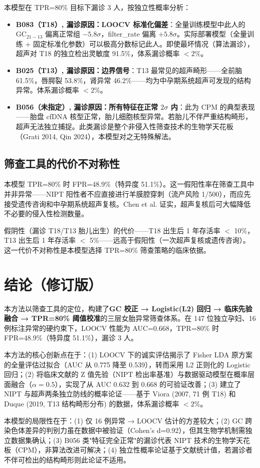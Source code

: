 \documentclass{internal-report}
\begin{document}
本模型在 TPR=80\% 目标下漏诊 3 人，按独立性概率分析：

\begin{itemize}
    \item \textbf{B083（T18）, 漏诊原因：LOOCV 标准化偏差}：全量训练模型中此人的 GC$_{21-13}$ 偏离正常组 $-5.8\sigma$，filter\_rate 偏离 $+5.8\sigma$。实际部署模型（全量训练 + 固定标准化参数）可以极高分数标记此人。即使最坏情况（算法漏诊），超声对 T18 的独立检出灵敏度 91.5\%\cite{viora2007}，体系漏诊概率 $< 2\%$。
    
    \item \textbf{B025（T13）, 漏诊原因：边界信号}：T13 最常见的超声畸形——全前脑 61.5\%，唇腭裂 53.8\%，肾异常 46.2\%\cite{duque2019}——均为中孕期系统超声可发现的结构异常。体系漏诊概率 $< 2\%$。
    
    \item \textbf{B056（未指定）, 漏诊原因：所有特征在正常 $2\sigma$ 内}：此为 CPM 的典型表现——胎盘 cfDNA 核型正常，胎儿细胞核型异常。若胎儿不伴严重结构畸形，超声无法独立捕捉。此类漏诊是整个非侵入性筛查技术的生物学天花板（Grati 2014, Qin 2024），本模型对之无特殊解法。
\end{itemize}

\subsection{筛查工具的代价不对称性}

本模型 TPR=80\% 时 FPR=48.9\%（特异度 51.1\%）。这一假阳性率在筛查工具中并非异常——NIPT 阳性者不应直接进行羊膜腔穿刺（流产风险 1/500），而应先接受遗传咨询和中孕期系统超声复核。Chen et al.\cite{chen2025} 证实，超声复核后可大幅降低不必要的侵入性检测数量。

假阴性（漏诊 T18/T13 胎儿出生）的代价——T18 出生后 1 年存活率 $<$ 10\%，T13 出生后 1 年存活率 $<$ 5\%——远高于假阳性（一次超声复核或遗传咨询）。这一代价不对称性是本模型选择 TPR=80\% 筛查策略的临床依据。

\section{结论（修订版）}

本方法以筛查工具的定位，构建了\textbf{GC 校正 → Logistic(L2) 回归 → 临床先验融合 → TPR=80\% 阈值校准}的三层女胎异常筛查体系。在 147 位独立孕妇、16 例标注异常的硬约束下，LOOCV 性能为 AUC=0.668，TPR=80\% 时 FPR=48.9\%（特异度 51.1\%），漏诊 3 人。

本方法的核心创新点在于：(1) LOOCV 下的诚实评估揭示了 Fisher LDA 原方案的全量评估过拟合（AUC 从 0.775 降至 0.539），转而采用 L2 正则化的 Logistic 回归；(2) 将临床文献的 Z 值先验（NIPT 检出率基准）与数据驱动模型在概率层面融合（$\alpha=0.5$），实现了从 AUC 0.632 到 0.668 的可验证改善；(3) 建立了 NIPT 与超声两条独立防线的概率论证——基于 Viora (2007, 71 例 T18) 和 Duque (2019, T13 结构畸形分布) 的数据，体系漏诊概率 $< 2\%$。

本模型的局限性在于：(1) 仅 16 例异常 → LOOCV 估计的方差较大；(2) GC 跨染色体差异的判别力虽在数据中被验证（Cohen's d=0.92），但其生物学机制需独立数据集确认；(3) B056 类"特征完全正常"的漏诊代表 NIPT 技术的生物学天花板（CPM），非算法改进可解决；(4) 独立性概率论证基于文献统计值，若漏诊者不伴可检出的结构畸形则此论证不适用。
\end{document}
